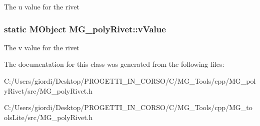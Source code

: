 The u value for the rivet \hypertarget{class_m_g__poly_rivet_aec3670f4f9a06480753efc8006076603}{
\subsubsection[{v\-Value}]{\setlength{\rightskip}{0pt plus 5cm}static M\-Object M\-G\-\_\-poly\-Rivet\-::v\-Value\hspace{0.3cm}{\ttfamily [static]}}}\label{class_m_g__poly_rivet_aec3670f4f9a06480753efc8006076603}
The v value for the rivet 

The documentation for this class was generated from the following files\-:\begin{DoxyCompactItemize}
\item 
C\-:/\-Users/giordi/\-Desktop/\-P\-R\-O\-G\-E\-T\-T\-I\-\_\-\-I\-N\-\_\-\-C\-O\-R\-S\-O/\-C/\-M\-G\-\_\-\-Tools/cpp/\-M\-G\-\_\-poly\-Rivet/src/M\-G\-\_\-poly\-Rivet.\-h\item 
C\-:/\-Users/giordi/\-Desktop/\-P\-R\-O\-G\-E\-T\-T\-I\-\_\-\-I\-N\-\_\-\-C\-O\-R\-S\-O/\-C/\-M\-G\-\_\-\-Tools/cpp/\-M\-G\-\_\-tools\-Lite/src/M\-G\-\_\-poly\-Rivet.\-h\end{DoxyCompactItemize}
